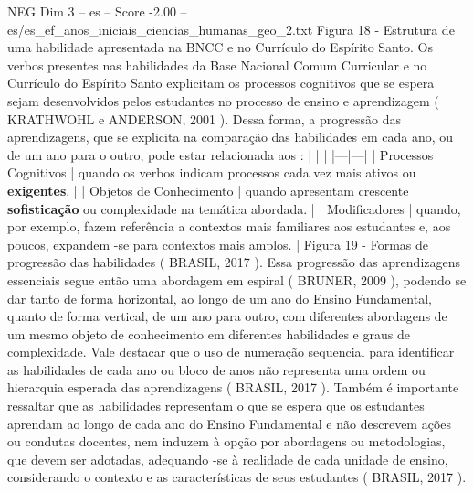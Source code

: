 \begin{textsample}{NEG Dim 3 – es – Score -2.00 – es/es\_ef\_anos\_iniciais\_ciencias\_humanas\_geo\_2.txt}
Figura 18 - Estrutura de uma habilidade apresentada na BNCC e no Currículo do Espírito Santo.
Os verbos presentes nas habilidades da Base Nacional Comum Curricular e no Currículo do Espírito Santo explicitam os processos cognitivos que se espera sejam desenvolvidos pelos estudantes no processo de ensino e aprendizagem ( KRATHWOHL e ANDERSON, 2001 ).
Dessa forma, a progressão das aprendizagens, que se explicita na comparação das habilidades em cada ano, ou de um ano para o outro, pode estar relacionada aos : | | | |---|---| | Processos Cognitivos | quando os verbos indicam processos cada vez mais ativos ou \textbf{exigentes}. | | Objetos de Conhecimento | quando apresentam crescente \textbf{sofisticação} ou complexidade na temática abordada. | | Modificadores | quando, por exemplo, fazem referência a contextos mais familiares aos estudantes e, aos poucos, expandem -se para contextos mais amplos. | Figura 19 - Formas de progressão das habilidades ( BRASIL, 2017 ).
Essa progressão das aprendizagens essenciais segue então uma abordagem em espiral ( BRUNER, 2009 ), podendo se dar tanto de forma horizontal, ao longo de um ano do Ensino Fundamental, quanto de forma vertical, de um ano para outro, com diferentes abordagens de um mesmo objeto de conhecimento em diferentes habilidades e graus de complexidade.
Vale destacar que o uso de numeração sequencial para identificar as habilidades de cada ano ou bloco de anos não representa uma ordem ou hierarquia esperada das aprendizagens ( BRASIL, 2017 ).
Também é importante ressaltar que as habilidades representam o que se espera que os estudantes aprendam ao longo de cada ano do Ensino Fundamental e não descrevem ações ou condutas docentes, nem induzem à opção por abordagens ou metodologias, que devem ser adotadas, adequando -se à realidade de cada unidade de ensino, considerando o contexto e as características de seus estudantes ( BRASIL, 2017 ).

\end{textsample}
